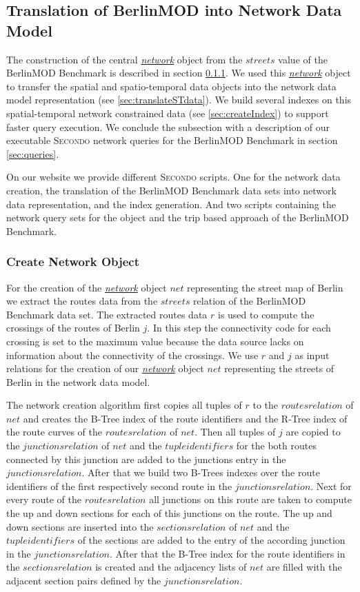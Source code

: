 \documentclass[a4paper]{article}
\newcommand{\secondo}{\textsc{Secondo}}
\newcommand{\bmodb} {BerlinMOD Benchmark}
\newcommand{\dt}[1]{\textsl{\underline{#1}}}
\begin{document}
{\subsection{Translation of BerlinMOD into Network Data Model}
\label{sec:Translation}
The construction of the central \dt{network} object from the $streets$ value
of the \bmodb{} is described in section \ref{sec:createNetwork}. We used this
\dt{network} object to transfer the spatial and spatio-temporal data objects into
the network data model representation (see \ref{sec:translateSTdata}). We build
several indexes on this spatial-temporal network constrained data (see
\ref{sec:createIndex}) to support faster query execution. We conclude the subsection
with a description of our executable \secondo{} network queries for the \bmodb{}
in section \ref{sec:queries}.

On our website \cite{berlinmodweb} we provide different \secondo{} scripts. One
for the network data creation, the translation of the \bmodb{} data sets into
network data representation, and the index generation. And two scripts containing
the network query sets for the object and the trip based approach of the \bmodb{}.
\subsubsection{Create Network Object}
\label{sec:createNetwork}
For the creation of the \dt{network} object $net$ representing the street map of
Berlin we extract the routes data from the $streets$ relation of the \bmodb{}
data set. The extracted routes data $r$ is used to compute the crossings of the
routes of Berlin $j$. In this step the connectivity code for each crossing is
set to the maximum value because the data source lacks on information about the
connectivity of the crossings.
We use $r$ and $j$ as input relations for the creation of our \dt{network}
object $net$ representing the streets of Berlin in the network data model.

The network creation algorithm first copies all tuples of $r$ to the
$routes relation$ of $net$ and creates the B-Tree index of the route
identifiers and the R-Tree index of the route curves of the $routes relation$ of
$net$. Then all tuples of $j$ are copied to the $junctions relation$
of $net$ and the $tuple identifiers$ for the both routes connected
by this junction are added to the junctions entry in the $junctions relation$.
After that we build two B-Trees indexes over the route identifiers of the first
respectively second route in the $junctions relation$. Next for every route of the
$routes relation$ all junctions on this route are taken to compute the up and
down sections for each of this junctions on the route. The up and down
sections are inserted into the $sections relation$ of $net$ and the
$tuple identifiers$ of the sections are added to the entry of the according
junction in the $junctions relation$. After that the B-Tree index for the
route identifiers in the $sections relation$ is created and the adjacency
lists of $net$ are filled with the adjacent section pairs defined by the
$junctions relation$.

}
\end{document}
